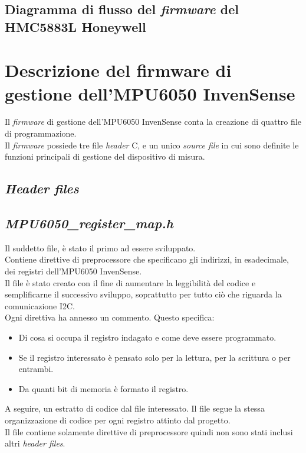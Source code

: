 \subsection{Diagramma di flusso del \textit{firmware} del HMC5883L Honeywell}

\newpage

\section{Descrizione del firmware di gestione dell'MPU6050 InvenSense}
Il \textit{firmware} di gestione dell'MPU6050 InvenSense conta la creazione di quattro file di programmazione.\\
Il \textit{firmware} possiede tre file \textit{header} C, e un unico \textit{source file} in cui sono definite le funzioni principali di gestione del dispositivo di misura.
\subsection{\textit{Header files}}
\subsection{\textit{MPU6050\_register\_map.h}}
Il suddetto file, è stato il primo ad essere sviluppato.\\
Contiene direttive di preprocessore che specificano gli indirizzi, in esadecimale, dei registri dell'MPU6050 InvenSense.\\
Il file è stato creato con il fine di aumentare la leggibilità del codice e semplificarne il successivo sviluppo, soprattutto per tutto ciò che riguarda la comunicazione I2C.\\
Ogni direttiva ha annesso un commento. Questo specifica:
\begin{itemize}
\item Di cosa si occupa il registro indagato e come deve essere programmato.
\item Se il registro interessato è pensato solo per la lettura, per la scrittura o per entrambi.
\item Da quanti bit di memoria è formato il registro.
\end{itemize}
A seguire, un estratto di codice dal file interessato. Il file segue la stessa organizzazione di codice per ogni registro attinto dal progetto.\\

Il file contiene solamente direttive di preprocessore quindi non sono stati inclusi altri \textit{header files}.

